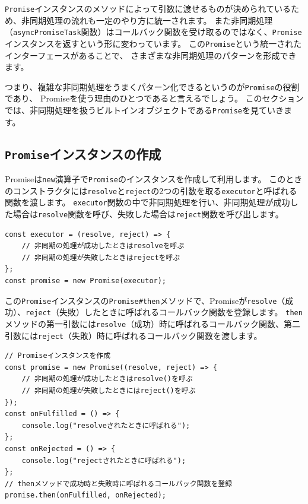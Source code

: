 \texttt{Promise}インスタンスのメソッドによって引数に渡せるものが決められているため、非同期処理の流れも一定のやり方に統一されます。
また非同期処理（\texttt{asyncPromiseTask}関数）はコールバック関数を受け取るのではなく、\texttt{Promise}インスタンスを返すという形に変わっています。
この\texttt{Promise}という統一されたインターフェースがあることで、
さまざまな非同期処理のパターンを形成できます。

つまり、複雑な非同期処理をうまくパターン化できるというのが\texttt{Promise}の役割であり、
Promiseを使う理由のひとつであると言えるでしょう。
このセクションでは、非同期処理を扱うビルトインオブジェクトである\texttt{Promise}を見ていきます。

\hypertarget{promise-instance}{%
\subsection{\texorpdfstring{\texttt{Promise}インスタンスの作成}{Promiseインスタンスの作成}}\label{promise-instance}}

Promiseは\texttt{new}演算子で\texttt{Promise}のインスタンスを作成して利用します。
このときのコンストラクタには\texttt{resolve}と\texttt{reject}の2つの引数を取る\texttt{executor}と呼ばれる関数を渡します。
\texttt{executor}関数の中で非同期処理を行い、非同期処理が成功した場合は\texttt{resolve}関数を呼び、失敗した場合は\texttt{reject}関数を呼び出します。

\begin{lstlisting}
const executor = (resolve, reject) => {
    // 非同期の処理が成功したときはresolveを呼ぶ
    // 非同期の処理が失敗したときはrejectを呼ぶ
};
const promise = new Promise(executor);
\end{lstlisting}

この\texttt{Promise}インスタンスの\texttt{Promise\#then}メソッドで、Promiseが\texttt{resolve}（成功）、\texttt{reject}（失敗）したときに呼ばれるコールバック関数を登録します。
\texttt{then}メソッドの第一引数には\texttt{resolve}（成功）時に呼ばれるコールバック関数、第二引数には\texttt{reject}（失敗）時に呼ばれるコールバック関数を渡します。

\begin{lstlisting}
// Promiseインスタンスを作成
const promise = new Promise((resolve, reject) => {
    // 非同期の処理が成功したときはresolve()を呼ぶ
    // 非同期の処理が失敗したときにはreject()を呼ぶ
});
const onFulfilled = () => {
    console.log("resolveされたときに呼ばれる");
};
const onRejected = () => {
    console.log("rejectされたときに呼ばれる");
};
// thenメソッドで成功時と失敗時に呼ばれるコールバック関数を登録
promise.then(onFulfilled, onRejected);
\end{lstlisting}

